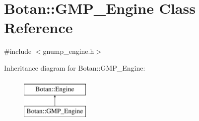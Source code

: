 \hypertarget{classBotan_1_1GMP__Engine}{\section{Botan\-:\-:G\-M\-P\-\_\-\-Engine Class Reference}
\label{classBotan_1_1GMP__Engine}
}


{\ttfamily \#include $<$gnump\-\_\-engine.\-h$>$}

Inheritance diagram for Botan\-:\-:G\-M\-P\-\_\-\-Engine\-:\begin{figure}[H]
\begin{center}
\leavevmode
\includegraphics[height=2.000000cm]{classBotan_1_1GMP__Engine}
\end{center}
\end{figure}
